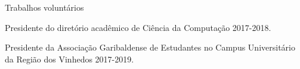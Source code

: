 \documentclass{resume} %
\begin{document}
\begin{rSection}{Trabalhos volunt\'arios} 
\item Presidente do diret\'orio acad\^emico de Ci\^encia da Computa\c{c}\~ao 2017-2018.
\item Presidente da Associa\c{c}\~ao Garibaldense de Estudantes no Campus Universit\'ario da Regi\~ao dos Vinhedos 2017-2019.
\end{rSection}
\end{document}
